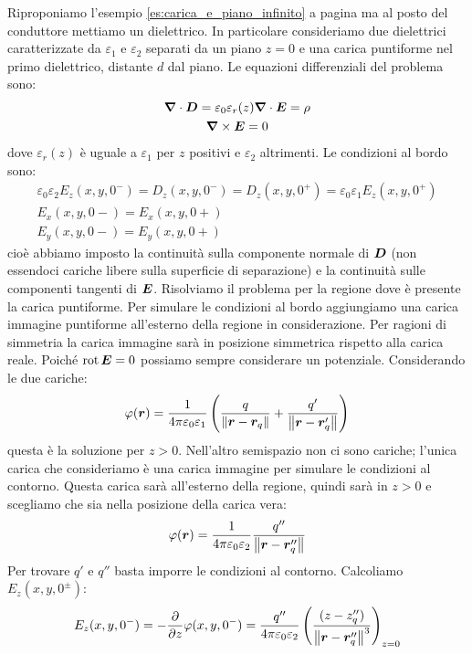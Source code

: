 \begin{Es}
  Riproponiamo l'esempio \ref{es:carica_e_piano_infinito} a pagina \pageref{es:carica_e_piano_infinito} ma al posto del conduttore mettiamo un dielettrico. In particolare consideriamo due dielettrici caratterizzate da $\varepsilon_1$ e $\varepsilon_2$ separati da un piano $z=0$ e una carica puntiforme nel primo dielettrico, distante $d$ dal piano. Le equazioni differenziali del problema sono:
  \begin{gather*}
    \boldsymbol{\nabla}\cdot\boldsymbol{D} = \varepsilon_0\varepsilon_r(z)\boldsymbol{\nabla}\cdot\boldsymbol{E} = \rho \\
    \boldsymbol{\nabla}\times\boldsymbol{E} = 0
  \end{gather*}
  dove $\varepsilon_r(z)$ è uguale a $\varepsilon_1$ per $z$ positivi e $\varepsilon_2$ altrimenti. Le condizioni al bordo sono:
  \begin{gather*}
    \varepsilon_0\varepsilon_2 E_z(x,y,0^-) = D_z(x,y,0^-) = D_z(x,y,0^+) = \varepsilon_0\varepsilon_1 E_z(x,y,0^+) \\
    E_x(x,y,0-) = E_x(x,y,0+) \\
    E_y(x,y,0-) = E_y(x,y,0+)
  \end{gather*}
  cioè abbiamo imposto la continuità sulla componente normale di $\boldsymbol{D}$ (non essendoci cariche libere sulla superficie di separazione) e la continuità sulle componenti tangenti di $\boldsymbol{E}$. Risolviamo il problema per la regione dove è presente la carica puntiforme. Per simulare le condizioni al bordo aggiungiamo una carica immagine puntiforme all'esterno della regione in considerazione. Per ragioni di simmetria la carica immagine sarà in posizione simmetrica rispetto alla carica reale. Poiché $\operatorname{rot}\boldsymbol{E} =0$ possiamo sempre considerare un potenziale. Considerando le due cariche:
  \[
    \varphi(\boldsymbol{r}) = \frac{1}{4\pi\varepsilon_0\varepsilon_1}\left(\frac{q}{\left\lVert\boldsymbol{r}-\boldsymbol{r}_q\right\rVert}+\frac{q'}{\left\lVert\boldsymbol{r}-\boldsymbol{r}_q'\right\rVert}\right)
  \]
  questa è la soluzione per $z>0$. Nell'altro semispazio non ci sono cariche; l'unica carica che consideriamo è una carica immagine per simulare le condizioni al contorno. Questa carica sarà all'esterno della regione, quindi sarà in $z>0$ e scegliamo che sia nella posizione della carica vera:
  \[
    \varphi(\boldsymbol{r}) = \frac{1}{4\pi\varepsilon_0\varepsilon_2}\frac{q''}{\left\lVert\boldsymbol{r}-\boldsymbol{r}_q''\right\rVert}
  \]
  Per trovare $q'$ e $q''$ basta imporre le condizioni al contorno. Calcoliamo $E_z(x,y,0^\pm)$:
  \begin{equation*}
    \begin{aligned}
      E_z(x,y,0^-) & = -\frac{\partial}{\partial z}\varphi(x,y,0^-) = \frac{q''}{\giorgi\varepsilon_2}\left(\frac{(z-z_q'')}{\norm{\ve r-\ve r_q''}^3}\right)_{z=0}                                       \\

\end{aligned}
\end{equation*}
\end{Es}
